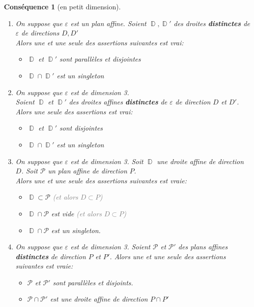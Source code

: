 \documentclass[a4paper, oneside]{report}
\theoremstyle{break}
\newtheorem{consequence}[thm]{Conséquence}
\newcommand{\gray}[1]{\textcolor{gray}{#1}}
\DeclareMathOperator{\D}{\mathbb{D}}
\renewcommand{\P}{\mathcal{P}}
\newcommand{\slign}{\textbf}
\newcommand{\ensP}{\P}
\newcommand{\ensD}{\D}
\begin{document}
\begin{consequence}[en petit dimension]
\begin{enumerate}
\item On suppose que $\varepsilon$ est un plan affine. Soient $\ensD, \ensD'$ des droites \slign{distinctes} de $\varepsilon$ de directions $D, D'$\\
Alors une et une seule des assertions suivantes est vrai:
\begin{itemize}[label=$\bullet$]
\item $\ensD$ et $\ensD'$ sont parallèles et disjointes

\item $\ensD \cap \ensD'$ est un singleton
\end{itemize}

\medbreak

\item On suppose que $\varepsilon$ est de dimension 3.\\
Soient $\ensD$ et $\ensD'$ des droites affines \slign{distinctes} de $\varepsilon$ de direction $D$ et $D'$.\\
Alors une seule des assertions est vrai:
\begin{itemize}[label=$\bullet$]
\item $\ensD$ et $\ensD'$ sont disjointes

\item $\ensD \cap \ensD'$ est un singleton
\end{itemize}

\medbreak

\item On suppose que $\varepsilon$ est de dimension 3. Soit $\ensD$ une droite affine de direction $D$. Soit $\ensP$ un plan affine de direction $P$.\\
Alors une et une seule des assertions suivantes est vraie:
\begin{itemize}[label=$\bullet$]
\item $\ensD \subset \ensP$	\quad	\gray{(et alors $D \subset P$)}

\item $\ensD \cap \ensP$ est vide 	\quad	\gray{(et alors $D \subset P$)}

\item $\ensD \cap \ensP$ est un singleton.
\end{itemize}

\medbreak

\item On suppose que $\varepsilon$ est de dimension 3. Soient $\ensP$ et $\ensP'$ des plans affines \slign{distinctes} de direction $P$ et $P'$. Alors une et une seule des assertions suivantes est vraie:
\begin{itemize}[label=$\bullet$]
\item $\ensP$ et $\ensP'$ sont parallèles et disjoints.

\item $\ensP \cap \ensP'$ est une droite affine de direction $P \cap P'$
\end{itemize}
\end{enumerate}
\end{consequence}
\end{document}
